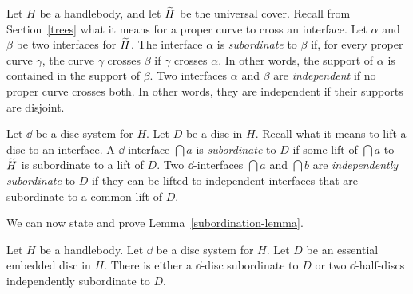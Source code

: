 Let $H$ be a handlebody, and let $\widetilde{H}$ be the universal cover.  Recall from Section~\ref{trees} what it means for a proper curve to cross an interface.  Let $\alpha$ and $\beta$ be two interfaces for $\widetilde{H}$.  The interface $\alpha$ is \emph{subordinate} to $\beta$ if, for every proper curve $\gamma$, the curve $\gamma$ crosses $\beta$ if $\gamma$ crosses $\alpha$.  In other words, the support of $\alpha$ is contained in the support of $\beta$.  Two interfaces $\alpha$ and $\beta$ are \emph{independent} if no proper curve crosses both.  In other words, they are independent if their supports are disjoint. 

Let $\dd$ be a disc system for $H$.  Let $D$ be a disc in $H$.  Recall what it means to lift a disc to an interface.  A $\dd$-interface $\dint{a}$ is \emph{subordinate} to $D$ if some lift of $\dint{a}$ to $\widetilde{H}$ is subordinate to a lift of $D$.   Two $\dd$-interfaces $\dint{a}$ and $\dint{b}$ are \emph{independently subordinate}
to $D$ if they can be lifted to independent interfaces that are subordinate to a common lift of $D$.

We can now state and prove Lemma~\ref{subordination-lemma}.

\begin{lemma}
\label{subordination-lemma}
Let $H$ be a handlebody.  Let $\dd$ be a disc system for $H$.  Let $D$ be an essential embedded disc in $H$.  There is either a $\dd$-disc subordinate to $D$ or two $\dd$-half-discs independently subordinate to $D$.
\end{lemma}

